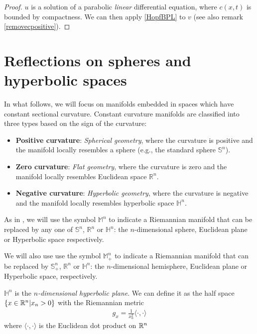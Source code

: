 \begin{proof}
	$u$ is a solution of a parabolic \textit{linear} differential equation, where  $c(x, t)$ is bounded by compactness. We can then apply \ref{HopfBPL} to $v$ (see also remark \ref{removecpositive}).
\end{proof}

\section{Reflections on spheres and hyperbolic spaces}	

In what follows, we will focus on manifolds embedded in spaces which have constant sectional curvature. Constant curvature manifolds are classified into three types based on the sign of the curvature:
\begin{itemize}
	\item \textbf{Positive curvature}: \textit{Spherical geometry}, where the curvature is positive and the manifold locally resembles a sphere (e.g., the standard sphere $\mathbb{S}^n$).
	\item \textbf{Zero curvature}: \textit{Flat geometry}, where the curvature is zero and the manifold locally resembles Euclidean space $\mathbb{R}^n$.
	\item \textbf{Negative curvature}: \textit{Hyperbolic geometry}, where the curvature is negative and the manifold locally resembles hyperbolic space $\mathbb{H}^n$.
\end{itemize}

As in \cite{italiani}, we will use the symbol $\mathbb{M}^n$ to indicate a Riemannian manifold that can be replaced by any one of  $\mathbb{S}^n$, $\mathbb{R}^n$ or $\mathbb{H}^n$: the $n$-dimensional sphere, Euclidean plane or Hyperbolic space respectively. 

We will also use use the symbol $\mathbb{M}^n_+$ to indicate a Riemannian manifold that can be replaced by $\mathbb{S}^n_+$, $\mathbb{R}^n$ or $\mathbb{H}^n$: the $n$-dimensional hemisphere, Euclidean plane or Hyperbolic space, respectively.


\begin{defin}
	$\mathbb{H}^n$ is the {\em $n$-dimensional hyperbolic plane}. We can define it as the half space $\{x\in \mathbb{R}^n|x_n > 0\}$ with the Riemannian metric
	\begin{align*}
		g_x=\frac{1}{x_n^2} \langle\cdot, \cdot \rangle
	\end{align*}
	where $\langle\cdot, \cdot \rangle$ is the Euclidean dot product on $\mathbb{R}^n$
\end{defin}


